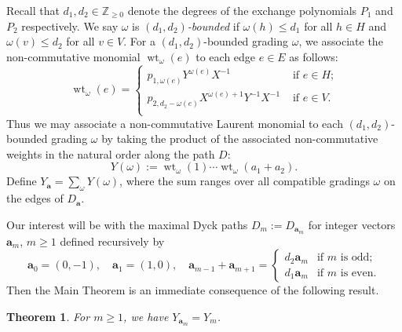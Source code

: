 \documentclass{amsart}
\newtheorem{theorem}{Theorem}[section]
\newcommand{\bfa}{\mathbf{a}}
\newcommand{\ZZ}{\mathbb{Z}}
\newcommand{\wt}{\operatorname{wt}}
\begin{document}
Recall that $d_1,d_2\in\ZZ_{\ge0}$ denote the degrees of the exchange polynomials $P_1$ and $P_2$ respectively.  We say $\omega$ is \emph{$(d_1,d_2)$-bounded} if $\omega(h)\le d_1$ for all $h\in H$ and $\omega(v)\le d_2$ for all $v\in V$.  
For a $(d_1,d_2)$-bounded grading $\omega$, we associate the non-commutative monomial $\wt_\omega(e)$ to each edge $e\in E$ as follows:
\begin{equation}\label{eq:edge weights}
  \wt_\omega(e)=\begin{cases}
                    p_{1,\omega(e)}Y^{\omega(e)}X^{-1} & \text{ if $e\in H$;}\\
                    p_{2,d_2-\omega(e)}X^{\omega(e)+1}Y^{-1}X^{-1} & \text{ if $e\in V$.}\\
                \end{cases}
\end{equation}
Thus we may associate a non-commutative Laurent monomial to each $(d_1,d_2)$-bounded grading $\omega$ by taking the product of the associated non-commutative weights in the natural order along the path $D$:
\[Y(\omega):=\wt_\omega(1)\cdots\wt_\omega(a_1+a_2).\]
Define $Y_\bfa=\sum\limits_\omega Y(\omega)$, where the sum ranges over all compatible gradings $\omega$ on the edges of $D_\bfa$.

Our interest will be with the maximal Dyck paths $D_m:=D_{\bfa_m}$ for integer vectors $\bfa_m$, $m\ge1$ defined recursively by
\begin{equation}\label{eq:roots recursive}
  \bfa_0=(0,-1),\quad
  \bfa_1=(1,0),\quad
  \bfa_{m-1}+\bfa_{m+1}=\begin{cases}d_2\bfa_m & \text{if $m$ is odd;}\\ d_1\bfa_m & \text{if $m$ is even.}\end{cases}
\end{equation}
Then the Main Theorem is an immediate consequence of the following result.
\begin{theorem}\label{th:combinatorial construction}
 For $m\ge1$, we have $Y_{\bfa_m}=Y_m$.
\end{theorem}

\end{document}
